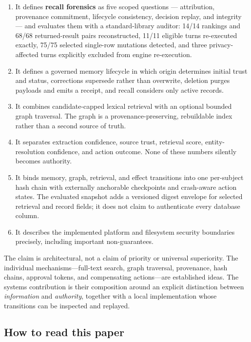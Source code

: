 \begin{enumerate}
  \item It defines \textbf{recall forensics} as five scoped questions --- attribution, provenance commitment, lifecycle consistency, decision replay, and integrity --- and evaluates them with a standard-library auditor: 14/14 rankings and 68/68 returned-result pairs reconstructed, 11/11 eligible turns re-executed exactly, 75/75 selected single-row mutations detected, and three privacy-affected turns explicitly excluded from engine re-execution.
  \item It defines a governed memory lifecycle in which origin determines initial trust and status, corrections supersede rather than overwrite, deletion purges payloads and emits a receipt, and recall considers only active records.
  \item It combines candidate-capped lexical retrieval with an optional bounded graph traversal. The graph is a provenance-preserving, rebuildable index rather than a second source of truth.
  \item It separates extraction confidence, source trust, retrieval score, entity-resolution confidence, and action outcome. None of these numbers silently becomes authority.
  \item It binds memory, graph, retrieval, and effect transitions into one per-subject hash chain with externally anchorable checkpoints and crash-aware action states. The evaluated snapshot adds a versioned digest envelope for selected retrieval and record fields; it does not claim to authenticate every database column.
  \item It describes the implemented platform and filesystem security boundaries precisely, including important non-guarantees.
\end{enumerate}

The claim is architectural, not a claim of priority or universal superiority. The individual mechanisms---full-text search, graph traversal, provenance, hash chains, approval tokens, and compensating actions---are established ideas. The systems contribution is their composition around an explicit distinction between \emph{information} and \emph{authority}, together with a local implementation whose transitions can be inspected and replayed.

\subsection{How to read this paper}

